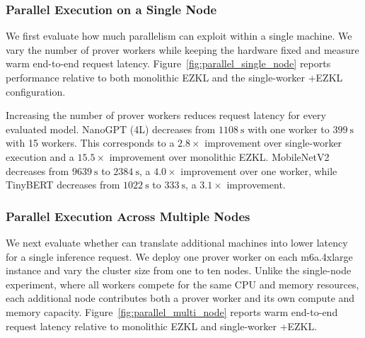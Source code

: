 \subsubsection{\textbf{Parallel Execution on a Single Node}}

We first evaluate how much parallelism \TITLE{} can exploit within a single
machine. We vary the number of prover workers while keeping the hardware fixed
and measure warm end-to-end request latency.
Figure~\ref{fig:parallel_single_node} reports performance relative to both
monolithic EZKL and the single-worker \TITLE{}+EZKL configuration.

Increasing the number of prover workers reduces request latency for every
evaluated model. NanoGPT (4L) decreases from
\(\qty[quantity-product = {}]{1108}{\second}\) with one worker to
\(\qty[quantity-product = {}]{399}{\second}\) with 15 workers. This
corresponds to a \(\num{2.8}\times\) improvement over single-worker execution
and a \(\num{15.5}\times\) improvement over monolithic EZKL. MobileNetV2
decreases from \(\qty[quantity-product = {}]{9639}{\second}\) to
\(\qty[quantity-product = {}]{2384}{\second}\), a
\(\num{4.0}\times\) improvement over one worker, while TinyBERT decreases
from \(\qty[quantity-product = {}]{1022}{\second}\) to
\(\qty[quantity-product = {}]{333}{\second}\), a
\(\num{3.1}\times\) improvement.




\subsubsection{\textbf{Parallel Execution Across Multiple Nodes}}

We next evaluate whether \TITLE{} can translate additional machines into lower
latency for a single inference request. We deploy one prover worker on each
m6a.4xlarge instance and vary the cluster size from one to ten nodes. Unlike
the single-node experiment, where all workers compete for the same CPU and
memory resources, each additional node contributes both a prover worker and
its own compute and memory capacity. Figure~\ref{fig:parallel_multi_node}
reports warm end-to-end request latency relative to monolithic EZKL and
single-worker \TITLE{}+EZKL.

